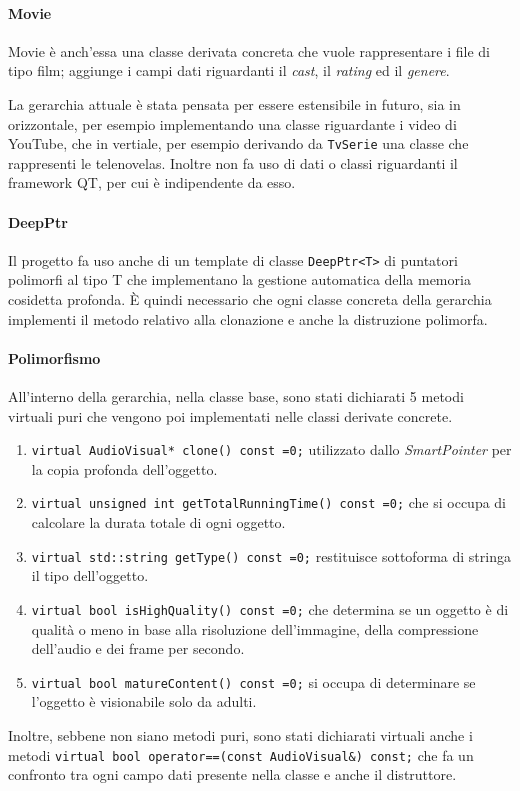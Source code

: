 \paragraph{Movie}
Movie è anch'essa una classe derivata concreta che vuole rappresentare i file di tipo film; aggiunge i campi dati riguardanti il \textit{cast}, il \textit{rating} ed il \textit{genere}. \newline

La gerarchia attuale è stata pensata per essere estensibile in futuro, sia in orizzontale, per esempio implementando una classe riguardante i video di YouTube, che in vertiale, per esempio derivando da \texttt{TvSerie} una classe che rappresenti le telenovelas. \newline
Inoltre non fa uso di dati o classi riguardanti il framework QT, per cui è indipendente da esso.

\paragraph{DeepPtr}
Il progetto fa uso anche di un template di classe \texttt{DeepPtr<T>} di puntatori polimorfi al tipo T che implementano la gestione automatica della memoria cosidetta profonda. È quindi necessario che ogni classe concreta della gerarchia implementi il metodo relativo alla clonazione e anche la distruzione polimorfa.

\paragraph{Polimorfismo}
All'interno della gerarchia, nella classe base, sono stati dichiarati 5 metodi virtuali puri che vengono poi implementati nelle classi derivate concrete. 
\begin{enumerate}
    \item \texttt{virtual AudioVisual* clone() const =0;} utilizzato dallo \textit{SmartPointer} per la copia profonda dell'oggetto.
    \item \texttt{virtual unsigned int getTotalRunningTime() const =0;} che si occupa di calcolare la durata totale di ogni oggetto.
    \item \texttt{virtual std::string getType() const =0;} restituisce sottoforma di stringa il tipo dell'oggetto.
    \item \texttt{virtual bool isHighQuality() const =0;} che determina se un oggetto è di qualità o meno in base alla risoluzione dell'immagine, della compressione dell'audio e dei frame per secondo.
    \item \texttt{virtual bool matureContent() const =0;} si occupa di determinare se l'oggetto è visionabile solo da adulti.
\end{enumerate}
Inoltre, sebbene non siano metodi puri, sono stati dichiarati virtuali anche i metodi \texttt{virtual bool operator==(const AudioVisual\&) const;} che fa un confronto tra ogni campo dati presente nella classe e anche il distruttore.




